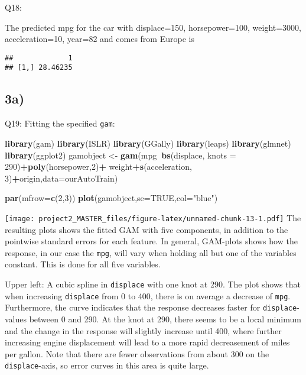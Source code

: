 \documentclass[]{article}
\newenvironment{Shaded}{\begin{snugshade}}{\end{snugshade}}
\newcommand{\KeywordTok}[1]{\textcolor[rgb]{0.13,0.29,0.53}{\textbf{#1}}}
\newcommand{\DataTypeTok}[1]{\textcolor[rgb]{0.13,0.29,0.53}{#1}}
\newcommand{\DecValTok}[1]{\textcolor[rgb]{0.00,0.00,0.81}{#1}}
\newcommand{\StringTok}[1]{\textcolor[rgb]{0.31,0.60,0.02}{#1}}
\newcommand{\OtherTok}[1]{\textcolor[rgb]{0.56,0.35,0.01}{#1}}
\newcommand{\OperatorTok}[1]{\textcolor[rgb]{0.81,0.36,0.00}{\textbf{#1}}}
\newcommand{\NormalTok}[1]{#1}
\begin{document}
Q18:

The predicted mpg for the car with displace=150, horsepower=100,
weight=3000, acceleration=10, year=82 and comes from Europe is

\begin{verbatim}
##             1
## [1,] 28.46235
\end{verbatim}

\subsection{3a)}\label{a-1}

Q19: Fitting the specified \texttt{gam}:

\begin{Shaded}
\begin{Highlighting}[]
\KeywordTok{library}\NormalTok{(gam)}
\KeywordTok{library}\NormalTok{(ISLR)}
\KeywordTok{library}\NormalTok{(GGally)}
\KeywordTok{library}\NormalTok{(leaps)}
\KeywordTok{library}\NormalTok{(glmnet)}
\KeywordTok{library}\NormalTok{(ggplot2)}
\NormalTok{gamobject <-}\StringTok{ }\KeywordTok{gam}\NormalTok{(mpg}\OperatorTok{~}\KeywordTok{bs}\NormalTok{(displace, }\DataTypeTok{knots =} \DecValTok{290}\NormalTok{)}\OperatorTok{+}\KeywordTok{poly}\NormalTok{(horsepower,}\DecValTok{2}\NormalTok{)}\OperatorTok{+}
\StringTok{                   }\NormalTok{weight}\OperatorTok{+}\KeywordTok{s}\NormalTok{(acceleration, }\DecValTok{3}\NormalTok{)}\OperatorTok{+}\NormalTok{origin,}\DataTypeTok{data=}\NormalTok{ourAutoTrain)}

\KeywordTok{par}\NormalTok{(}\DataTypeTok{mfrow=}\KeywordTok{c}\NormalTok{(}\DecValTok{2}\NormalTok{,}\DecValTok{3}\NormalTok{))}
\KeywordTok{plot}\NormalTok{(gamobject,}\DataTypeTok{se=}\OtherTok{TRUE}\NormalTok{,}\DataTypeTok{col=}\StringTok{"blue"}\NormalTok{)}
\end{Highlighting}
\end{Shaded}

\texttt{[image: project2\_MASTER\_files/figure-latex/unnamed-chunk-13-1.pdf]}
The resulting plots shows the fitted GAM with five components, in
addition to the pointwise standard errors for each feature. In general,
GAM-plots shows how the response, in our case the \texttt{mpg}, will
vary when holding all but one of the variables constant. This is done
for all five variables.

Upper left: A cubic spline in \texttt{displace} with one knot at 290.
The plot shows that when increasing \texttt{displace} from 0 to 400,
there is on average a decrease of \texttt{mpg}. Furthermore, the curve
indicates that the response decreases faster for
\texttt{displace}-values between 0 and 290. At the knot at 290, there
seems to be a local minimum and the change in the response will slightly
increase until 400, where further increasing engine displacement will
lead to a more rapid decreasement of miles per gallon. Note that there
are fewer observations from about 300 on the \texttt{displace}-axis, so
error curves in this area is quite large.
\end{document}
